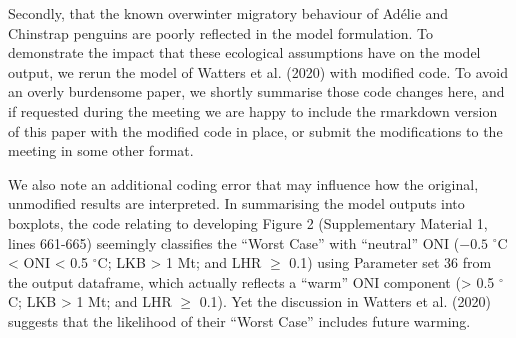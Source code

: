\documentclass[]{elsarticle} %
\begin{document}
Secondly, that the known overwinter migratory behaviour of Adélie and
Chinstrap penguins are poorly reflected in the model formulation. To
demonstrate the impact that these ecological assumptions have on the
model output, we rerun the model of Watters et al. (2020) with modified
code. To avoid an overly burdensome paper, we shortly summarise those
code changes here, and if requested during the meeting we are happy to
include the rmarkdown version of this paper with the modified code in
place, or submit the modifications to the meeting in some other format.

We also note an additional coding error that may influence how the
original, unmodified results are interpreted. In summarising the model
outputs into boxplots, the code relating to developing Figure 2
(Supplementary Material 1, lines 661-665) seemingly classifies the
``Worst Case'' with ``neutral'' ONI (\({-0.5}\) \(^{\circ}\)C
\textless{} ONI \textless{} 0.5 \(^{\circ}\)C; LKB \textgreater{} 1 Mt;
and LHR \(\geqslant\) 0.1) using Parameter set 36 from the output
dataframe, which actually reflects a ``warm'' ONI component
(\textgreater{} 0.5 \(^{\circ}\)C; LKB \textgreater{} 1 Mt; and LHR
\(\geqslant\) 0.1). Yet the discussion in Watters et al. (2020) suggests
that the likelihood of their ``Worst Case'' includes future warming.
\end{document}
